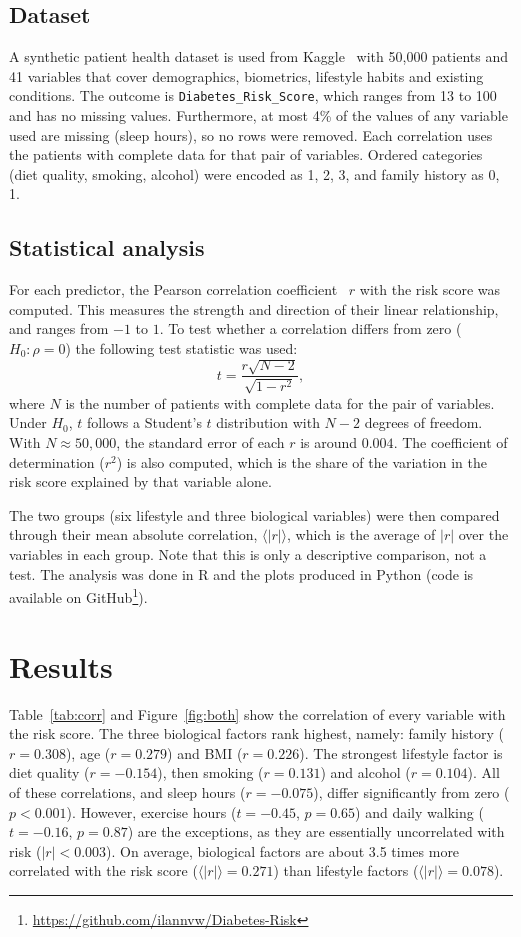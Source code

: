 \documentclass{article}
\begin{document}
\subsection{Dataset}
A synthetic patient health dataset is used from Kaggle~\cite{dataset} with 50,000 patients and 41 variables that cover demographics, biometrics, lifestyle habits and existing conditions. The outcome is \texttt{Diabetes\_Risk\_Score}, which ranges from 13 to 100 and has no missing values. Furthermore, at most 4\% of the values of any variable used are missing (sleep hours), so no rows were removed. Each correlation uses the patients with complete data for that pair of variables. Ordered categories (diet quality, smoking, alcohol) were encoded as 1, 2, 3, and family history as 0, 1.  

\subsection{Statistical analysis}
For each predictor, the Pearson correlation coefficient~\cite{pearson} $r$ with the risk score was computed. This measures the strength and direction of their linear relationship, and ranges from $-1$ to $1$. To test whether a correlation differs from zero ($H_0:\rho=0$) the following test statistic was used:
\begin{equation}
  t = \frac{r\sqrt{N-2}}{\sqrt{1-r^{2}}},
\end{equation}
where $N$ is the number of patients with complete data for the pair of variables. Under $H_0$, $t$ follows a Student's $t$ distribution with $N-2$ degrees of freedom. With $N\approx50,000$, the standard error of each $r$ is around $0.004$. The coefficient of determination ($r^2$) is also computed, which is the share of the variation in the risk score explained by that variable alone.

The two groups (six lifestyle and three biological variables) were then compared through their mean absolute correlation, $\langle |r|\rangle$,  which is the average of $|r|$ over the variables in each group. Note that this is only a descriptive comparison, not a test. The analysis was done in R and the plots produced in Python (code is available on GitHub\footnote{\url{https://github.com/ilannvw/Diabetes-Risk}}).

\section{Results}
Table~\ref{tab:corr} and Figure~\ref{fig:both} show the  correlation of every variable with the risk score. The three biological factors rank highest, namely: family history ($r=0.308$), age ($r=0.279$) and BMI ($r=0.226$). The strongest lifestyle factor is diet quality ($r=-0.154$), then smoking ($r=0.131$) and alcohol ($r=0.104$). All of these correlations, and sleep hours ($r=-0.075$), differ significantly from zero ($p<0.001$). However, exercise hours ($t=-0.45$, $p=0.65$) and daily walking ($t=-0.16$, $p=0.87$) are the exceptions, as they are essentially uncorrelated with risk ($|r|<0.003$). On average, biological factors are about 3.5 times more correlated with the risk score ($\langle|r|\rangle=0.271$) than lifestyle factors ($\langle|r|\rangle=0.078$).
\end{document}
